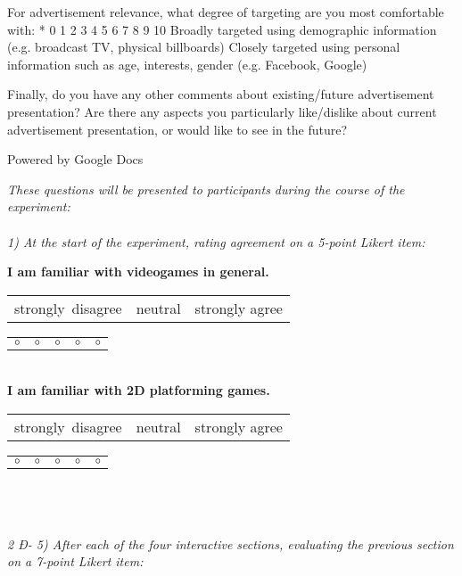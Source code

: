 For advertisement relevance, what degree of targeting are you most comfortable with: *
0
1
2
3
4
5
6
7
8
9
10
Broadly targeted using demographic information (e.g. broadcast TV, physical billboards)												Closely targeted using personal information such as age, interests, gender (e.g. Facebook, Google)

Finally, do you have any other comments about existing/future advertisement presentation?
Are there any aspects you particularly like/dislike about current advertisement presentation, or would like to see in the future?



Powered by Google Docs


	\textit{These questions will be presented to participants during the course of the experiment:}
\\
\\

\textit{1) At the start of the experiment, rating agreement on a 5-point Likert item:}

\textbf{I am familiar with videogames in general.}

\begin{tabularx}{\linewidth}%
 {>{\raggedright}X%
  >{\centering}X%
  >{\raggedleft}X}
strongly~disagree & neutral & strongly agree\tabularnewline
\end{tabularx}
\begin{tabularx}{\linewidth}%
 {>{\centering}X%
  >{\centering}X%
  >{\centering}X%
  >{\centering}X%
  >{\centering}X}
$\circ$ & $\circ$ & $\circ$ & $\circ$ & $\circ$
\end{tabularx}
\\

\textbf{I am familiar with 2D platforming games.}

\begin{tabularx}{\linewidth}%
 {>{\raggedright}X%
  >{\centering}X%
  >{\raggedleft}X}
strongly~disagree & neutral & strongly agree\tabularnewline
\end{tabularx}
\begin{tabularx}{\linewidth}%
 {>{\centering}X%
  >{\centering}X%
  >{\centering}X%
  >{\centering}X%
  >{\centering}X}
$\circ$ & $\circ$ & $\circ$ & $\circ$ & $\circ$
\end{tabularx}
\\
\\
\\

\textit{2 Ð- 5) After each of the four interactive sections, evaluating the previous section on a 7-point Likert item:}

